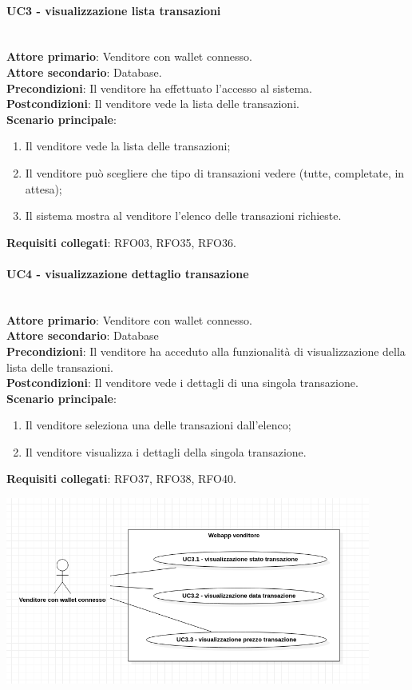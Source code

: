 \documentclass[a4paper, 12pt]{article}
\begin{document}
\paragraph{UC3 - visualizzazione lista transazioni}\\
\textbf{Attore primario}: Venditore con wallet connesso. \\
\textbf{Attore secondario}: Database. \\
\textbf{Precondizioni}: Il venditore ha effettuato l'accesso al sistema.\\
\textbf{Postcondizioni}:  Il venditore vede la lista delle transazioni.\\
\textbf{Scenario principale}:
\begin{enumerate}
\item Il venditore vede la lista delle transazioni;
\item Il venditore può scegliere che tipo di transazioni vedere (tutte, completate, in attesa);
\item Il sistema mostra al venditore l'elenco delle transazioni richieste.
\end{enumerate}
\textbf{Requisiti collegati}: RFO03, RFO35, RFO36.

\paragraph{UC4 - visualizzazione dettaglio transazione}\\
\textbf{Attore primario}: Venditore con wallet connesso.\\
\textbf{Attore secondario}: Database\\
\textbf{Precondizioni}: Il venditore ha acceduto alla funzionalità di visualizzazione della lista delle transazioni.\\
\textbf{Postcondizioni}: Il venditore vede i dettagli di una singola transazione.\\
\textbf{Scenario principale}:
\begin{enumerate}
\item Il venditore seleziona una delle transazioni dall'elenco;
\item Il venditore visualizza i dettagli della singola transazione.
\end{enumerate}
\textbf{Requisiti collegati}: RFO37, RFO38, RFO40.

\includegraphics[width=0.9\textwidth]{UC3D}
\end{document}
